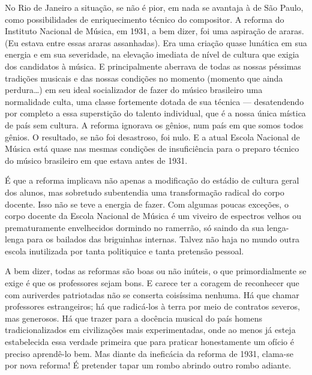 No Rio de Janeiro a situação, se não é pior, em nada se avantaja à de
São Paulo, como possibilidades de enriquecimento técnico do compositor.
A reforma do Instituto Nacional de Música, em 1931, a bem dizer, foi uma
aspiração de araras. (Eu estava entre essas araras assanhadas). Era uma
criação quase lunática em sua energia e em sua severidade, na elevação
imediata de nível de cultura que exigia dos candidatos à música. E
principalmente aberrava de todas as nossas péssimas tradições musicais e
das nossas condições no momento (momento que ainda perdura\ldots{}) em seu
ideal socializador de fazer do músico brasileiro uma normalidade culta,
uma classe fortemente dotada de sua técnica --- desatendendo por completo
a essa superstição do talento individual, que é a nossa única mística de
país sem cultura. A reforma ignorava os gênios, num país em que somos
todos gênios. O resultado, se não foi desastroso, foi nulo. E a atual
Escola Nacional de Música está quase nas mesmas condições de
insuficiência para o preparo técnico do músico brasileiro em que estava
antes de 1931.

É que a reforma implicava não apenas a modificação do estádio de cultura
geral dos alunos, mas sobretudo subentendia uma transformação radical do
corpo docente. Isso não se teve a energia de fazer. Com algumas poucas
exceções, o corpo docente da Escola Nacional de Música é um viveiro de
espectros velhos ou prematuramente envelhecidos dormindo no ramerrão, só
saindo da sua lenga-lenga para os bailados das briguinhas internas.
Talvez não haja no mundo outra escola inutilizada por tanta politiquice
e tanta pretensão pessoal.

A bem dizer, todas as reformas são boas ou não inúteis, o que
primordialmente se exige é que os professores sejam bons. E carece ter a
coragem de reconhecer que com auriverdes patriotadas não se conserta
coisíssima nenhuma. Há que chamar professores estrangeiros; há que
radicá-los à terra por meio de contratos severos, mas generosos. Há que
trazer para a docência musical do país homens tradicionalizados em
civilizações mais experimentadas, onde ao menos já esteja estabelecida
essa verdade primeira que para praticar honestamente um ofício é preciso
aprendê-lo bem. Mas diante da ineficácia da reforma de 1931, clama-se por
nova reforma! É pretender tapar um rombo abrindo outro rombo adiante.

